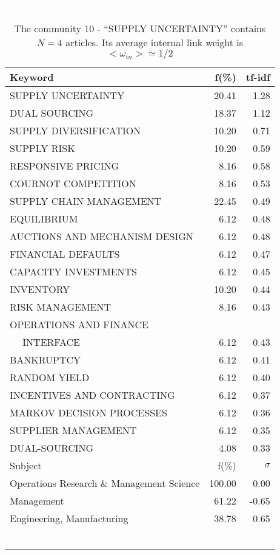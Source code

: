 \documentclass[a4paper,11pt]{report}
\begin{document}
\begin{landscape}
\begin{table}[!ht]
\caption{The community 10 - ``SUPPLY UNCERTAINTY'' contains $N = 4$ articles. Its average internal link weight is $<\omega_{in}> \simeq 1/2$ }
\textcolor{white}{aa}\\
{\scriptsize\begin{tabular}{|l r  r|}
\hline
Keyword & f(\%) & tf-idf \\
\hline
SUPPLY UNCERTAINTY & 20.41 & 1.28\\
DUAL SOURCING & 18.37 & 1.12\\
SUPPLY DIVERSIFICATION & 10.20 & 0.71\\
SUPPLY RISK & 10.20 & 0.59\\
RESPONSIVE PRICING & 8.16 & 0.58\\
COURNOT COMPETITION & 8.16 & 0.53\\
SUPPLY CHAIN MANAGEMENT & 22.45 & 0.49\\
EQUILIBRIUM & 6.12 & 0.48\\
AUCTIONS AND MECHANISM DESIGN & 6.12 & 0.48\\
FINANCIAL DEFAULTS & 6.12 & 0.47\\
CAPACITY INVESTMENTS & 6.12 & 0.45\\
INVENTORY & 10.20 & 0.44\\
RISK MANAGEMENT & 8.16 & 0.43\\
OPERATIONS AND FINANCE &  &\\
$\quad$ INTERFACE & 6.12 & 0.43\\
BANKRUPTCY & 6.12 & 0.41\\
RANDOM YIELD & 6.12 & 0.40\\
INCENTIVES AND CONTRACTING & 6.12 & 0.37\\
MARKOV DECISION PROCESSES & 6.12 & 0.36\\
SUPPLIER MANAGEMENT & 6.12 & 0.35\\
DUAL-SOURCING & 4.08 & 0.33\\
\hline
\hline
Subject & f(\%) & $\sigma$\\
\hline
Operations Research \& Management Science & 100.00 & 0.00\\
Management & 61.22 & -0.65\\
Engineering, Manufacturing & 38.78 & 0.65\\
 &  & \\
 &  & \\
 &  & \\
 &  & \\
 &  & \\
 &  & \\

\end{tabular}}
\end{table}
\end{landscape}
\end{document}
